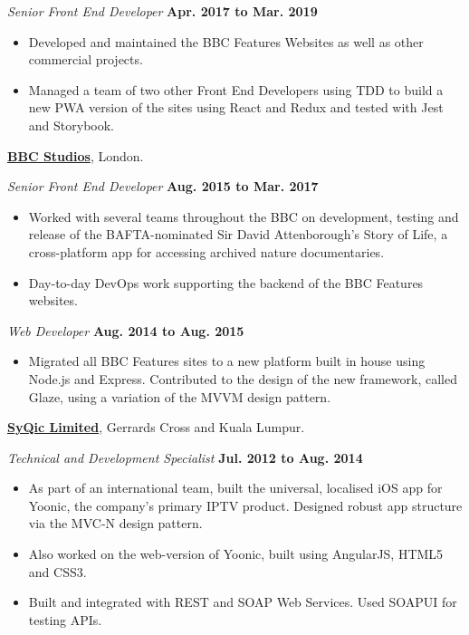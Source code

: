 \documentclass[11pt]{article}
\newenvironment{innerlist}[1][\enskip\textbullet]%
        {\begin{itemize}[#1,leftmargin=*,parsep=0pt,itemsep=0pt,topsep=0pt,partopsep=0pt]}
        {\end{itemize}}
\newcommand{\halfblankline}{\quad\vspace{-0.5\baselineskip}\pagebreak[3]}
\begin{document}
\textit{Senior Front End Developer}%
        \hfill \textbf{Apr. 2017 to Mar. 2019}
\begin{innerlist}
\item Developed and maintained the BBC Features Websites as well as other commercial projects.
\item Managed a team of two other Front End Developers using TDD to build a new PWA version of the sites using React and Redux and tested with Jest and Storybook.
\end{innerlist}

\halfblankline

\href{https://www.bbcstudios.com}{\textbf{BBC Studios}},
London.

\halfblankline

\textit{Senior Front End Developer}%
        \hfill \textbf{Aug. 2015 to Mar. 2017}
\begin{innerlist}
\item Worked with several teams throughout the BBC on development, testing and release of the BAFTA-nominated Sir David Attenborough's Story of Life, a cross-platform app for accessing archived nature documentaries.
\item Day-to-day DevOps work supporting the backend of the BBC Features websites.
\end{innerlist}

\halfblankline

\textit{Web Developer}%
        \hfill \textbf{Aug. 2014 to Aug. 2015}
\begin{innerlist}
\item Migrated all BBC Features sites to a new platform built in house using Node.js and Express. Contributed to the design of the new framework, called Glaze, using a variation of the MVVM design pattern.
\end{innerlist}

\halfblankline

\href{http://www.syqic.com}{\textbf{SyQic Limited}},
Gerrards Cross and Kuala Lumpur.

\halfblankline

\textit{Technical and Development Specialist}%
        \hfill \textbf{Jul. 2012 to Aug. 2014}
\begin{innerlist}
\item As part of an international team, built the universal, localised iOS app for Yoonic, the company's primary IPTV product. Designed robust app structure via the MVC-N design pattern.
\item Also worked on the web-version of Yoonic, built using AngularJS, HTML5 and CSS3.
\item Built and integrated with REST and SOAP Web Services. Used SOAPUI for testing APIs.
\end{innerlist}
\end{document}
